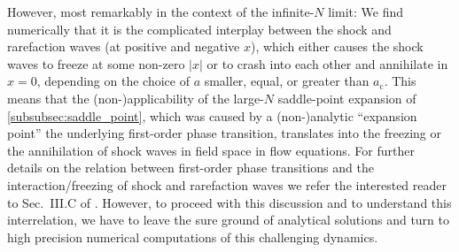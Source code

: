 However, most remarkably in the context of the infinite-$N$ limit: We find numerically that it is the complicated interplay between the shock and rarefaction waves (at positive and negative $x$), which either causes the shock waves to freeze at some non-zero $|x|$ or to crash into each other and annihilate in $x = 0$, depending on the choice of $a$ \dash{} smaller, equal, or greater than $a_\mathrm{c}$. This means that the (non\nobreakdash-)applicability of the large-$N$ saddle-point expansion of \cref{subsubsec:saddle_point}, which was caused by a (non\nobreakdash-)analytic ``expansion point'' \dash{} the underlying first-order phase transition, translates into the freezing or the annihilation of shock waves in field space in \frg{} flow equations. For further details on the relation between first-order phase transitions and the interaction/freezing of shock and rarefaction waves we refer the interested reader to Sec.~III.C of . However, to proceed with this discussion and to understand this interrelation, we have to leave the sure ground of analytical solutions and turn to high precision numerical computations of this challenging dynamics.

